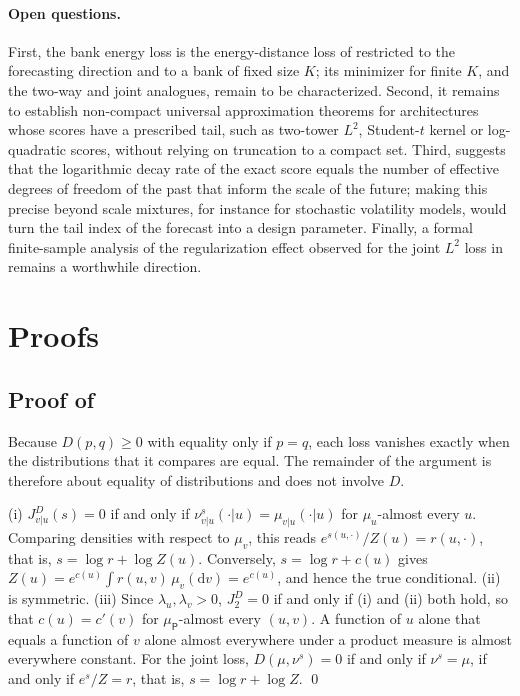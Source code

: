 \documentclass[11pt]{article}
\theoremstyle{plain}
\theoremstyle{definition}
\theoremstyle{remark}
\newcommand{\Dd}{\mathrm{d}}
\newcommand{\muP}{\mu_{\mathsf{P}}}
\newcommand{\Jvu}{J_{v\vert u}}
\newcommand{\Jtwo}{J_{2}}
\begin{document}
\paragraph{Open questions.}
First, the bank energy loss is the energy-distance loss of
\cite[Rem.~3.5]{baptista2025mathematical} restricted to the forecasting
direction and to a bank of fixed size $K$; its minimizer for finite $K$, and
the two-way and joint analogues, remain to be characterized. Second, it
remains to establish non-compact universal approximation theorems for
architectures whose scores have a prescribed tail, such as two-tower $L^2$,
Student-$t$ kernel or log-quadratic scores, without relying on truncation to
a compact set. Third,  suggests that the logarithmic decay
rate of the exact score equals the number of effective degrees of freedom of
the past that inform the scale of the future; making this precise beyond
scale mixtures, for instance for stochastic volatility models, would turn the
tail index of the forecast into a design parameter. Finally, a formal
finite-sample analysis of the regularization effect observed for the joint
$L^2$ loss in  remains a worthwhile direction.

\appendix
\section{Proofs}
\label{app:proofs}

\subsection{Proof of \texorpdfstring{}{Proposition 3.1}}
\label{app:target}
Because $D(p,q)\ge0$ with equality only if $p=q$, each loss vanishes exactly
when the distributions that it compares are equal. The remainder of the
argument is therefore about equality of distributions and does not involve
$D$.

(i) $\Jvu^{D}(s)=0$ if and only if $\nu^{s}_{v\vert u}(\cdot\vert u)=\mu_{v\vert u}(\cdot\vert u)$
for $\mu_u$-almost every $u$. Comparing densities with respect to $\mu_v$,
this reads $e^{s(u,\cdot)}/Z(u)=r(u,\cdot)$, that is,
$s=\log r+\log Z(u)$. Conversely, $s=\log r+c(u)$ gives
$Z(u)=e^{c(u)}\int r(u,v)\,\mu_v(\Dd v)=e^{c(u)}$, and hence the true
conditional. (ii) is symmetric. (iii) Since $\lambda_u,\lambda_v>0$,
$\Jtwo^{D}=0$ if and only if (i) and (ii) both hold, so that $c(u)=c'(v)$ for
$\muP$-almost every $(u,v)$. A function of $u$ alone that equals a function
of $v$ alone almost everywhere under a product measure is almost everywhere
constant. For the joint loss, $D(\mu,\nu^{s})=0$ if and only if
$\nu^{s}=\mu$, if and only if $e^{s}/Z=r$, that is, $s=\log r+\log Z$.
\qed
\end{document}
